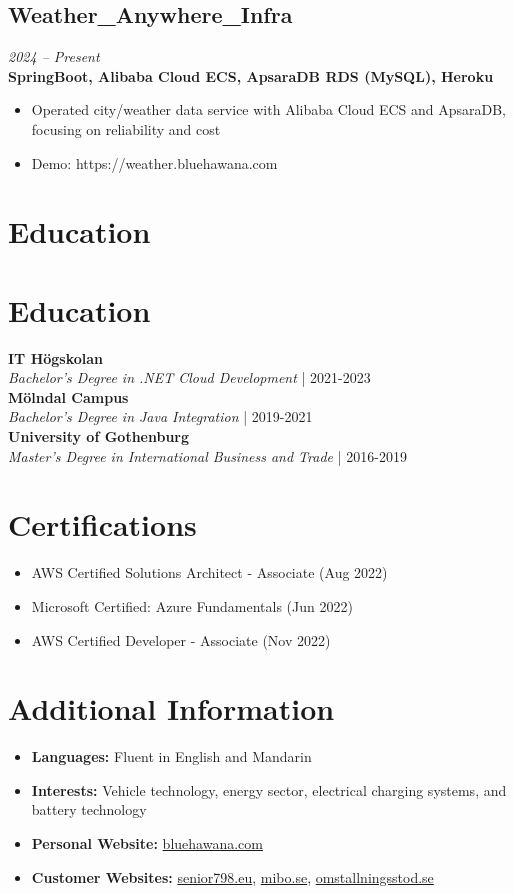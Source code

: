 \documentclass[11pt,a4paper]{article}
\begin{document}
\subsection{Weather\_Anywhere\_Infra}
\textit{2024 -- Present} \\
\textbf{SpringBoot, Alibaba Cloud ECS, ApsaraDB RDS (MySQL), Heroku}
\begin{itemize}
\item Operated city/weather data service with Alibaba Cloud ECS and ApsaraDB, focusing on reliability and cost
\item Demo: https://weather.bluehawana.com
\end{itemize}

\section*{Education}\section*{Education}
\textbf{IT Högskolan}\\
\textit{Bachelor's Degree in .NET Cloud Development} | 2021-2023\\
\textbf{Mölndal Campus}\\
\textit{Bachelor's Degree in Java Integration} | 2019-2021\\
\textbf{University of Gothenburg}\\
\textit{Master's Degree in International Business and Trade} | 2016-2019\\

\section*{Certifications}
\begin{itemize}
\item AWS Certified Solutions Architect - Associate (Aug 2022)
\item Microsoft Certified: Azure Fundamentals (Jun 2022)
\item AWS Certified Developer - Associate (Nov 2022)
\end{itemize}

\section*{Additional Information}
\begin{itemize}
\item \textbf{Languages:} Fluent in English and Mandarin
\item \textbf{Interests:} Vehicle technology, energy sector, electrical charging systems, and battery technology
\item \textbf{Personal Website:} \href{https://www.bluehawana.com}{bluehawana.com}
\item \textbf{Customer Websites:} \href{https://www.senior798.eu}{senior798.eu}, \href{https://www.mibo.se}{mibo.se}, \href{https://www.omstallningsstod.se}{omstallningsstod.se}
\end{itemize}
\end{document}
